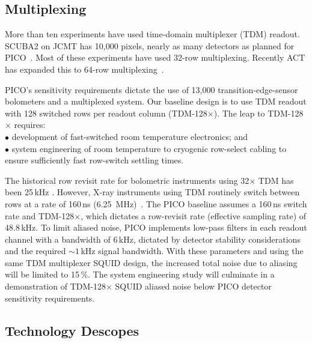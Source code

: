 \subsection{Multiplexing}
\label{sec:multiplexing}

More than ten experiments have used time-domain multiplexer (TDM) readout. SCUBA2 on JCMT has 10,000 pixels, nearly as many detectors as planned for PICO~\citep{Holland2013}. Most of these experiments have used 32-row multiplexing. Recently ACT has expanded this to 64-row multiplexing~\citep{Henderson2016}.

PICO's sensitivity requirements dictate the use of 13,000 transition-edge-sensor bolometers and a multiplexed system.  Our baseline design is to use TDM readout with 128 switched rows per readout column (TDM-128$\times$). The leap to TDM-128$\times$ requires: \\
$\bullet$ development of fast-switched room temperature electronics; and \\
$\bullet$ system engineering of room temperature to cryogenic row-select cabling to ensure sufficiently fast row-switch settling times.

The historical row revisit rate for bolometric instruments using 32$\times$ TDM has been 25\,kHz \cite[e.g.,][]{BICEP2015}. However, X-ray instruments using TDM routinely switch between rows at a rate of 160\,ns (6.25~MHz)~\citep{Doriese2016}. The PICO baseline assumes a 160\,ns switch rate and TDM-128$\times$, which dictates a row-revisit rate (effective sampling rate) of 48.8\,kHz. To limit aliased noise, PICO implements low-pass filters in each readout channel with a bandwidth of 6\,kHz, dictated by detector stability considerations and the required $\sim1$\,kHz signal bandwidth.  With these parameters and using the same TDM multiplexer SQUID design, the increased total noise due to aliasing will be limited to 15\,\%.  The system engineering study will culminate in a demonstration of TDM-128$\times$ SQUID aliased noise below PICO detector sensitivity requirements.


\subsection{Technology Descopes}
\label{sec:technology_descopes} %

